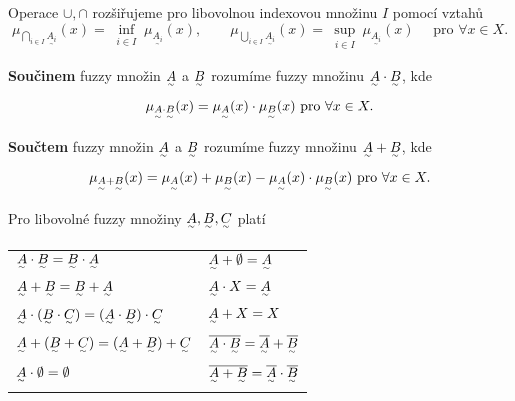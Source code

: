 {\begin{remark}
Operace $\cup, \cap$ rozšiřujeme pro libovolnou indexovou množinu $I$ pomocí vztahů
\begin{equation*}
\mu_{\bigcap\limits_{i \in I} \underset{^\sim}{A_i}}(x) = \inf_{\substack{i \in I}} \mu_{\underset{^\sim}{A_i}}(x), \qquad \mu_{\bigcup\limits_{i \in I} \underset{^\sim}{A_i}}(x) = \sup_{\substack{i \in I}} \mu_{\underset{^\sim}{A_i}}(x) \quad \text{ pro } \forall x \in X.
\end{equation*}
\end{remark}

\begin{definition}
\textbf{Součinem} fuzzy množin $\underset{^\sim}A$ a $\underset{^\sim}B$ rozumíme fuzzy množinu $\underset{^\sim}A \cdot \underset{^\sim}B$, kde
\begin{equation*}
\mu_{\underset{^\sim}A \cdot \underset{^\sim}B}(x) =  \mu_{\underset{^\sim}A}(x) \cdot \mu_{\underset{^\sim}B}(x) \text{ pro } \forall x \in X.
\end{equation*}
\end{definition}

\begin{definition}
\textbf{Součtem} fuzzy množin $\underset{^\sim}A$ a $\underset{^\sim}B$ rozumíme fuzzy množinu $\underset{^\sim}A + \underset{^\sim}B$, kde
\begin{equation*}
\mu_{\underset{^\sim}A + \underset{^\sim}B}(x) =  \mu_{\underset{^\sim}A}(x) + \mu_{\underset{^\sim}B}(x) - \mu_{\underset{^\sim}A}(x) \cdot \mu_{\underset{^\sim}B}(x) \text{ pro } \forall x \in X.
\end{equation*}
\end{definition}

\begin{theorem}
Pro libovolné fuzzy množiny $\underset{^\sim}A, \underset{^\sim}B, \underset{^\sim}C$ platí
\begin{table}[H]
\centering
\begin{tabular}{ll}
$\underset{^\sim}A \cdot \underset{^\sim}B = \underset{^\sim}B \cdot \underset{^\sim}A$                         & $\underset{^\sim}A + \emptyset = \underset{^\sim}A$                                    \\
$\underset{^\sim}A + \underset{^\sim}B = \underset{^\sim}B + \underset{^\sim}A$                                 & $\underset{^\sim}A \cdot X= \underset{^\sim}A$                                           \\
$\underset{^\sim}A \cdot (\underset{^\sim}B \cdot \underset{^\sim}C) = (\underset{^\sim}A \cdot \underset{^\sim}B) \cdot \underset{^\sim}C$ & $\underset{^\sim}A + X = X$                                              \\
$\underset{^\sim}A + (\underset{^\sim}B + \underset{^\sim}C) = (\underset{^\sim}A + \underset{^\sim}B) + \underset{^\sim}C$                 & $\overline{\underset{^\sim}A \cdot \underset{^\sim}B}=\overline{\underset{^\sim}A} + \overline{\underset{^\sim}B}$ \\
$\underset{^\sim}A \cdot \emptyset = \emptyset$                       & $\overline{\underset{^\sim}A + \underset{^\sim}B}=\overline{\underset{^\sim}A} \cdot \overline{\underset{^\sim}B}$
\end{tabular}
\end{table}
\end{theorem}

}
